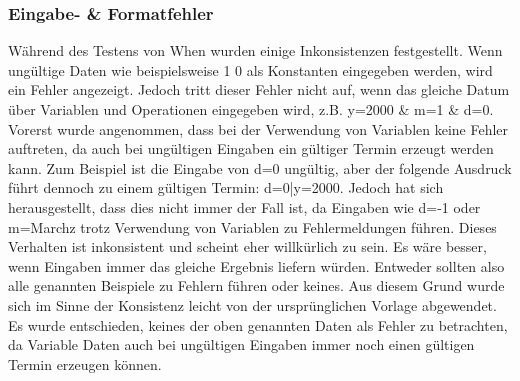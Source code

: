 \subsubsection{Eingabe- \& Formatfehler}%
Während des Testens von When wurden einige Inkonsistenzen festgestellt. %
Wenn ungültige Daten wie beispielsweise  1 0 \grqq{} als Konstanten eingegeben werden, wird ein Fehler angezeigt. Jedoch tritt dieser Fehler nicht auf, wenn das gleiche Datum über Variablen und Operationen eingegeben wird, z.B. \glqq y=2000 \& m=1 \& d=0\grqq{}.\newline%
Vorerst wurde angenommen, dass bei der Verwendung von Variablen keine Fehler auftreten, da auch bei ungültigen Eingaben ein gültiger Termin erzeugt werden kann. Zum Beispiel ist die Eingabe von \glqq d=0\grqq{} ungültig, aber der folgende Ausdruck führt dennoch zu einem gültigen Termin: \glqq d=0|y=2000\grqq{}.
	Jedoch hat sich herausgestellt, dass dies nicht immer der Fall ist, da Eingaben wie \glqq d=-1\grqq{} oder \glqq m=Marchz\grqq{} trotz Verwendung von Variablen zu Fehlermeldungen führen. %
Dieses Verhalten ist inkonsistent und scheint eher willkürlich zu sein. Es wäre besser, wenn Eingaben immer das gleiche Ergebnis liefern würden. Entweder sollten also alle genannten Beispiele zu Fehlern führen oder keines. Aus diesem Grund wurde sich im Sinne der Konsistenz leicht von der ursprünglichen Vorlage abgewendet. Es wurde entschieden, keines der oben genannten Daten als Fehler zu betrachten, da Variable Daten auch bei ungültigen Eingaben immer noch einen gültigen Termin erzeugen können.%
%
%
%
%
%
\myComment{
}